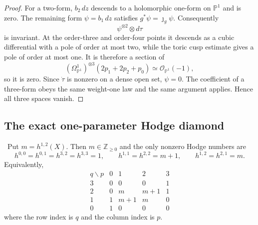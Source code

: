\begin{proof}
For a two-form, $b_2\,dz$ descends to a holomorphic one-form on
$\mathbb P^1$ and is zero.  The remaining form
$\psi=b_1\,dz$ satisfies $g^*\psi=\jmath_g\psi$.  Consequently
\[
 \psi^{\otimes2}\otimes d\tau
\]
is invariant.  At the order-three and order-four points it descends as a
cubic differential with a pole of order at most two, while the toric cusp
estimate gives a pole of order at most one.  It is therefore a section of
\[
 (\Omega^1_{\mathbb P^1})^{\otimes3}
 (2p_1+2p_2+p_0)\simeq\mathcal O_{\mathbb P^1}(-1),
\]
so it is zero.  Since $\dot\tau$ is nonzero on a dense open set,
$\psi=0$.  The coefficient of a three-form obeys the same weight-one law
and the same argument applies.  Hence all three spaces vanish.
\end{proof}

\subsection{The exact one-parameter Hodge diamond}

\begin{theorem}
\label{thm:parametric-hodge-diamond}
\Verified\ Put $m=h^{1,2}(X)$.  Then $m\in\mathbb Z_{\ge0}$ and the
only nonzero Hodge numbers are
\[
 h^{0,0}=h^{0,1}=h^{3,2}=h^{3,3}=1,
 \qquad
 h^{1,1}=h^{2,2}=m+1,
 \qquad
 h^{1,2}=h^{2,1}=m.
\]
Equivalently,
\[
\begin{array}{c|cccc}
q\backslash p&0&1&2&3\\ \hline
3&0&0&0&1\\
2&0&m&m+1&1\\
1&1&m+1&m&0\\
0&1&0&0&0
\end{array}
\]
where the row index is $q$ and the column index is $p$.
\end{theorem}

